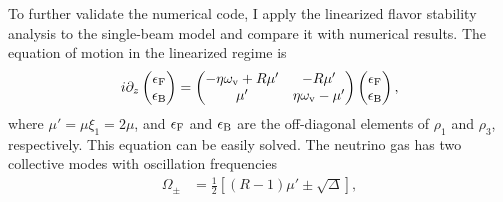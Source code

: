 To further validate the numerical code, I apply the linearized flavor stability analysis to the single-beam model and compare it with numerical results. The equation of motion in the linearized regime is
\begin{align*}
   i\partial_z \begin{pmatrix}
   \epsilon_{\mathrm F} \\
   \epsilon_{\mathrm B}
   \end{pmatrix} = \begin{pmatrix}
   -\eta\omega_\vv + R \mu' & - R  \mu' \\
   \mu' & \eta\omega_\vv -  \mu'
   \end{pmatrix} \begin{pmatrix}
   \epsilon_{\mathrm F} \\
   \epsilon_{\mathrm B}
   \end{pmatrix},
   \label{chap:collective-sec:halo-eqn:linearized-eom-single-beam-model}
\end{align*}
where $\mu'= \mu \xi_1 = 2\mu$, and $\epsilon_\mathrm F$ and $\epsilon_\mathrm B$ are the off-diagonal elements of $\rho_1$ and $\rho_3$, respectively.
This equation can be easily solved. The neutrino gas has two collective modes with oscillation frequencies
\begin{align}
   \Omega_\pm &= \frac{1}{2} [ (R-1)\mu' \pm \sqrt{\Delta} ],
\end{align}
